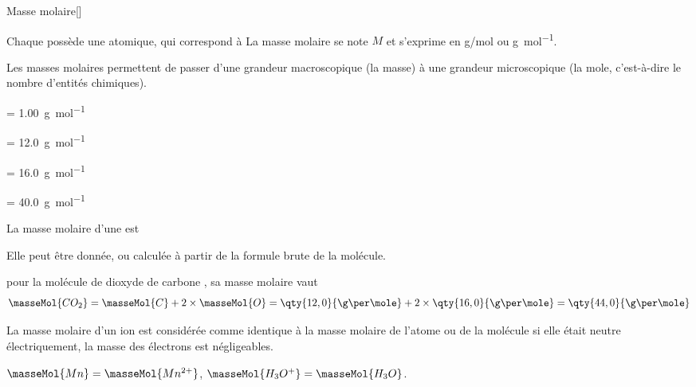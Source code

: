 \pasCorrection{\newpage\vspace*{-36pt}}
\begin{doc}{Masse molaire}[\label{doc:masse_molaire}]
  \begin{importants}
    Chaque  possède une  atomique, qui correspond à 
    La masse molaire se note $M$ et s'exprime en \unit{\g/\mole} ou \unit{\g\per\mole}.
  \end{importants}
  Les masses molaires permettent de passer d'une grandeur macroscopique (la masse) à une grandeur microscopique (la mole, c'est-à-dire le nombre d'entités chimiques).

  \begin{donnees}[2]
    \item {}  = \qty{1,00}{\g\per\mole}
    \item {}  = \qty{12,0}{\g\per\mole}
    \item {}  = \qty{16,0}{\g\per\mole}
    \item {} = \qty{40,0}{\g\per\mole}
  \end{donnees}

  \begin{importants}
    La masse molaire d'une  est 
  \end{importants}
  Elle peut être donnée, ou calculée à partir de la formule brute de la molécule.

  \exemple pour la molécule de dioxyde de carbone \dioxydeDeCarbone, sa masse molaire vaut
  \begin{equation*}
    \masseMol{CO_2} = \masseMol{C} + 2 \times \masseMol{O}
    = \qty{12,0}{\g\per\mole} + 2\times\qty{16,0}{\g\per\mole}
    = \qty{44,0}{\g\per\mole}
  \end{equation*}

  \begin{importants}
    La masse molaire d'un ion est considérée comme identique à la masse molaire de l'atome ou de la molécule si elle était neutre électriquement, la masse des électrons est négligeables.
  \end{importants}

  \exemple* $\masseMol{Mn} = \masseMol{Mn^{2+}}$,
  $\masseMol{H_3O^{+}} = \masseMol{H_3O}$.
\end{doc}

